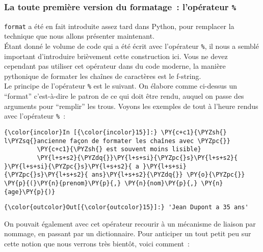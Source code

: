     \hypertarget{la-toute-premiuxe8re-version-du-formatage-lopuxe9rateur}{%
\subsubsection{\texorpdfstring{La toute première version du formatage~:
l'opérateur
\texttt{\%}}{La toute première version du formatage~: l'opérateur \%}}\label{la-toute-premiuxe8re-version-du-formatage-lopuxe9rateur}}

    \texttt{format} a été en fait introduite assez tard dans Python, pour
remplacer la technique que nous allons présenter maintenant.\\

Étant donné le volume de code qui a été écrit avec l'opérateur
\texttt{\%}, il nous a semblé important d'introduire brièvement cette
construction ici. Vous ne devez cependant pas utiliser cet opérateur
dans du code moderne, la manière pythonique de formater les chaînes de
caractères est le f-string.\\

    Le principe de l'opérateur \texttt{\%} est le suivant. On élabore comme
ci-dessus un ``format'' c'est-à-dire le patron de ce qui doit être
rendu, auquel on passe des arguments pour ``remplir'' les trous. Voyons
les exemples de tout à l'heure rendus avec l'opérateur \texttt{\%}~:

    \begin{Verbatim}[commandchars=\\\{\}]
{\color{incolor}In [{\color{incolor}15}]:} \PY{c+c1}{\PYZsh{} l\PYZsq{}ancienne façon de formater les chaînes avec \PYZpc{}}
         \PY{c+c1}{\PYZsh{} est souvent moins lisible}
         \PY{l+s+s2}{\PYZdq{}}\PY{l+s+si}{\PYZpc{}s}\PY{l+s+s2}{ }\PY{l+s+si}{\PYZpc{}s}\PY{l+s+s2}{ a }\PY{l+s+si}{\PYZpc{}s}\PY{l+s+s2}{ ans}\PY{l+s+s2}{\PYZdq{}} \PY{o}{\PYZpc{}} \PY{p}{(}\PY{n}{prenom}\PY{p}{,} \PY{n}{nom}\PY{p}{,} \PY{n}{age}\PY{p}{)}
\end{Verbatim}


\begin{Verbatim}[commandchars=\\\{\}]
{\color{outcolor}Out[{\color{outcolor}15}]:} 'Jean Dupont a 35 ans'
\end{Verbatim}
            
    On pouvait également avec cet opérateur recourir à un mécanisme de
liaison par nommage, en passant par un dictionnaire. Pour anticiper un
tout petit peu sur cette notion que nous verrons très bientôt, voici
comment~:

